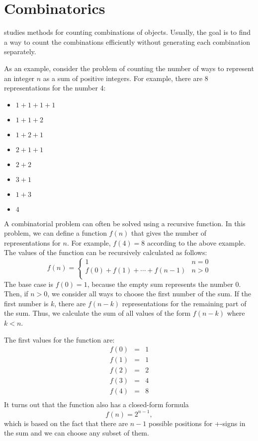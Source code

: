\chapter{Combinatorics}


 studies methods for counting
combinations of objects.
Usually, the goal is to find a way to
count the combinations efficiently
without generating each combination separately.

As an example, consider the problem
of counting the number of ways to
represent an integer $n$ as a sum of positive integers.
For example, there are 8 representations
for the number $4$:
\begin{multicols}{2}
\begin{itemize}
\item $1+1+1+1$
\item $1+1+2$
\item $1+2+1$
\item $2+1+1$
\item $2+2$
\item $3+1$
\item $1+3$
\item $4$
\end{itemize}
\end{multicols}

A combinatorial problem can often be solved
using a recursive function.
In this problem, we can define a function $f(n)$
that gives the number of representations for $n$.
For example, $f(4)=8$ according to the above example.
The values of the function
can be recursively calculated as follows:
\begin{equation*}
    f(n) = \begin{cases}
               1               & n = 0\\
               f(0)+f(1)+\cdots+f(n-1) & n > 0\\
           \end{cases}
\end{equation*}
The base case is $f(0)=1$,
because the empty sum represents the number 0.
Then, if $n>0$, we consider all ways to
choose the first number of the sum.
If the first number is $k$,
there are $f(n-k)$ representations
for the remaining part of the sum.
Thus, we calculate the sum of all values
of the form $f(n-k)$ where $k<n$.

The first values for the function are:
\[
\begin{array}{lcl}
f(0) & = & 1 \\
f(1) & = & 1 \\
f(2) & = & 2 \\
f(3) & = & 4 \\
f(4) & = & 8 \\
\end{array}
\]
It turns out that the function also has a closed-form formula
\[
f(n)=2^{n-1},
\]
which is based on the fact that there are $n-1$
possible positions for +-signs in the sum
and we can choose any subset of them.

